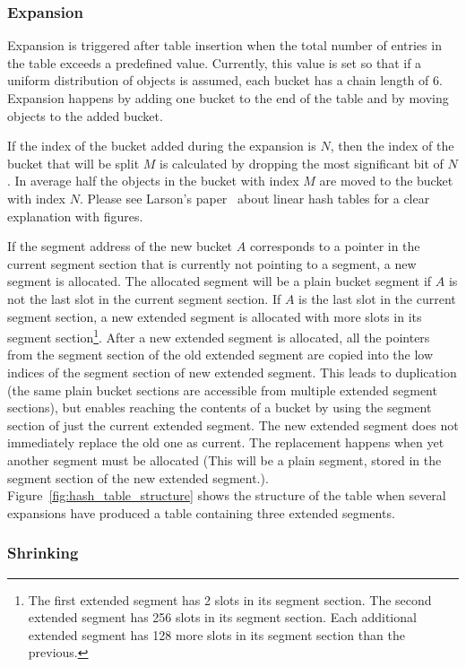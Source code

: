 \documentclass[aps,pre,preprint,nofootinbib]{revtex4}
\begin{document}
\subsubsection{Expansion}

Expansion is triggered after table insertion when the total number of entries in the table exceeds a predefined value.
Currently, this value is set so that if a uniform distribution of objects is assumed, each bucket has a chain length of 6.
Expansion happens by adding one bucket to the end of the table and by moving objects to the added bucket.

If the index of the bucket added during the expansion is $N$, then the index of the bucket that will be split $M$ is calculated by dropping the most significant bit of $N$.
In average half the objects in the bucket with index  $M$ are moved to the bucket with index $N$.
Please see Larson's paper~\cite{Larson} about linear hash tables for a clear explanation with figures.

If the segment address of the new bucket $A$ corresponds to a pointer in the current segment section that is currently not pointing to a segment, a new segment is allocated.
The allocated segment will be a plain bucket segment if $A$ is not the last slot in the current segment section.
If $A$ is the last slot in the current segment section, a new extended segment is allocated with more slots in its segment section\footnote{
  The first extended segment has 2 slots in its segment section.
  The second extended segment has 256 slots in its segment section.
  Each additional extended segment has 128 more slots in its segment section than the previous.
}.
After a new extended segment is allocated, all the pointers from the segment section of the old extended segment are copied into the low indices of the segment section of new extended segment.
This leads to duplication (the same plain bucket sections are accessible from multiple extended segment sections), but enables reaching the contents of a bucket by using the segment section of just the current extended segment.
The new extended segment does not immediately replace the old one as current.
The replacement happens when yet another segment must be allocated
(This will be a plain segment, stored in the segment section of the new extended segment.).
Figure~\ref{fig:hash_table_structure} shows the structure of the table when several expansions have produced a table containing three extended segments. 

\subsubsection{Shrinking}
\end{document}
